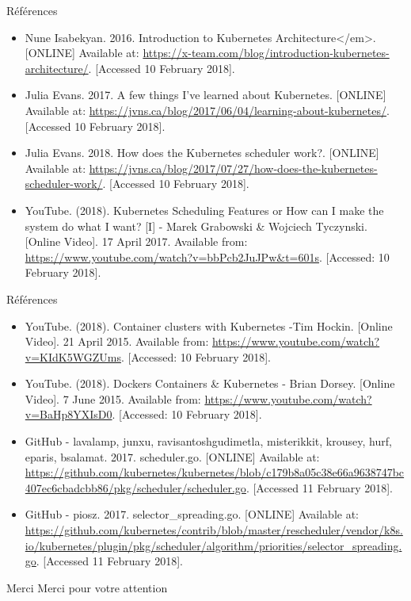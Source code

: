 \documentclass{bredelebeamer}
\begin{document}
\begin{frame}{Références}
\begin{itemize}
\item Nune Isabekyan. 2016. Introduction to Kubernetes Architecture</em>. [ONLINE] Available at: \url{https://x-team.com/blog/introduction-kubernetes-architecture/}. [Accessed 10 February 2018].
\item Julia Evans. 2017. A few things I've learned about Kubernetes. [ONLINE] Available at: \url{https://jvns.ca/blog/2017/06/04/learning-about-kubernetes/}. [Accessed 10 February 2018].
\item Julia Evans. 2018. How does the Kubernetes scheduler work?. [ONLINE] Available at: \url{https://jvns.ca/blog/2017/07/27/how-does-the-kubernetes-scheduler-work/}. [Accessed 10 February 2018].
\item YouTube. (2018). Kubernetes Scheduling Features or How can I make the system do what I want? [I] - Marek Grabowski \& Wojciech Tyczynski. [Online Video]. 17 April 2017. Available from: \url{https://www.youtube.com/watch?v=bbPcb2JuJPw&t=601s}. [Accessed: 10 February 2018].
\end{itemize}
\end{frame}


\begin{frame}{Références}
\begin{itemize}

\item YouTube. (2018). Container clusters with Kubernetes -Tim Hockin. [Online Video]. 21 April 2015. Available from: \url{https://www.youtube.com/watch?v=KIdK5WGZUms}. [Accessed: 10 February 2018].
\item YouTube. (2018). Dockers Containers \& Kubernetes - Brian Dorsey. [Online Video]. 7 June 2015. Available from: \url{https://www.youtube.com/watch?v=BaHp8YXIsD0}. [Accessed: 10 February 2018].

\item GitHub - lavalamp, junxu, ravisantoshgudimetla, misterikkit, krousey, hurf, eparis, bsalamat. 2017. scheduler.go. [ONLINE] Available at: \url{https://github.com/kubernetes/kubernetes/blob/c179b8a05c38e66a9638747bc407ec6cbadcbb86/pkg/scheduler/scheduler.go}. [Accessed 11 February 2018].
\item GitHub - piosz. 2017. selector\_spreading.go. [ONLINE] Available at: \url{https://github.com/kubernetes/contrib/blob/master/rescheduler/vendor/k8s.io/kubernetes/plugin/pkg/scheduler/algorithm/priorities/selector_spreading.go}. [Accessed 11 February 2018].
\end{itemize}
\end{frame}

\begin{frame}{Merci}
\centering
Merci pour votre attention
\end{frame}
\end{document}
